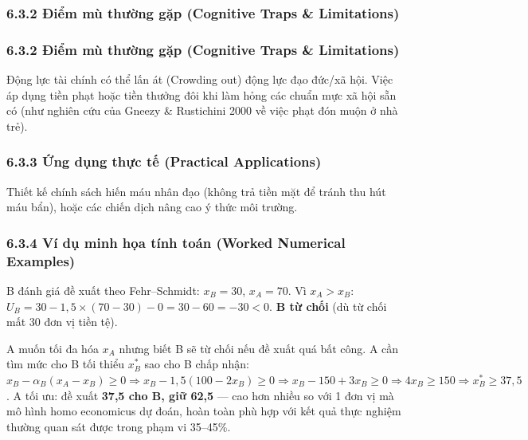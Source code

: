 \documentclass[
]{article}
\begin{document}
\subsubsection{6.3.2 Điểm mù thường gặp (Cognitive Traps \&
Limitations)}\label{ux111iux1ec3m-muxf9-thux1b0ux1eddng-gux1eb7p-cognitive-traps-limitations-19}

\subsubsection{6.3.2 Điểm mù thường gặp (Cognitive Traps \&
Limitations)}\label{ux111iux1ec3m-muxf9-thux1b0ux1eddng-gux1eb7p-cognitive-traps-limitations-20}

Động lực tài chính có thể lấn át (Crowding out) động lực đạo đức/xã hội.
Việc áp dụng tiền phạt hoặc tiền thưởng đôi khi làm hỏng các chuẩn mực
xã hội sẵn có (như nghiên cứu của Gneezy \& Rustichini 2000 về việc phạt
đón muộn ở nhà trẻ).

\subsubsection{6.3.3 Ứng dụng thực tế (Practical
Applications)}\label{ux1ee9ng-dux1ee5ng-thux1ef1c-tux1ebf-practical-applications-11}

Thiết kế chính sách hiến máu nhân đạo (không trả tiền mặt để tránh thu
hút máu bẩn), hoặc các chiến dịch nâng cao ý thức môi trường.

\subsubsection{6.3.4 Ví dụ minh họa tính toán (Worked Numerical
Examples)}\label{vuxed-dux1ee5-minh-hux1ecda-tuxednh-touxe1n-worked-numerical-examples-10}

B đánh giá đề xuất theo Fehr--Schmidt: \(x_B = 30\), \(x_A = 70\). Vì
\(x_A > x_B\):
\(U_B = 30 - 1{,}5 \times (70 - 30) - 0 = 30 - 60 = -30 < 0\). \textbf{B
từ chối} (dù từ chối mất 30 đơn vị tiền tệ).

A muốn tối đa hóa \(x_A\) nhưng biết B sẽ từ chối nếu đề xuất quá bất
công. A cần tìm mức cho B tối thiểu \(x_B^*\) sao cho B chấp nhận:
\(x_B - \alpha_B(x_A - x_B) \ge 0 \Rightarrow x_B - 1{,}5(100 - 2x_B) \ge 0 \Rightarrow x_B - 150 + 3x_B \ge 0 \Rightarrow 4x_B \ge 150 \Rightarrow x_B^* \ge 37{,}5\).
A tối ưu: đề xuất \textbf{37,5 cho B, giữ 62,5} --- cao hơn nhiều so với
1 đơn vị mà mô hình homo economicus dự đoán, hoàn toàn phù hợp với kết
quả thực nghiệm thường quan sát được trong phạm vi 35--45\%.
\end{document}
